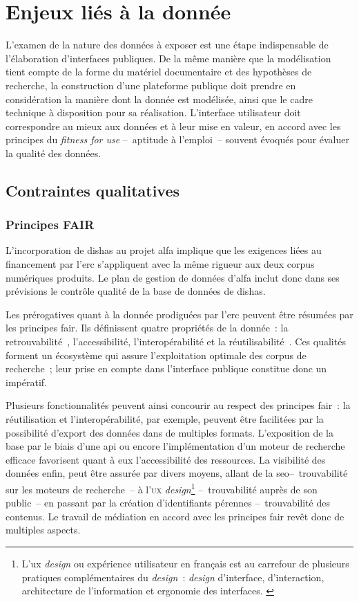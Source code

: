 \documentclass[a4paper,12pt,twoside]{book}
\newcommand{\eng}{\emph}
\newcommand{\bdd}{base de données\xspace}
\newcommand{\g}[1]{\og#1~\fg}
\newcommand{\dishas}{\gls{dishas}\xspace}
\newcommand{\alfa}{\gls{alfa}\xspace}
\newcommand{\erc}{\gls{erc}\xspace}
\newcommand{\fair}{\gls{fair}\xspace}
\newcommand{\api}{\gls{api}\xspace}
\newcommand{\seo}{\gls{seo}\xspace}
\newcommand{\ux}{\gls{ux} \emph{design}\xspace}
\begin{document}
	\section{Enjeux liés à la donnée}
L'examen de la nature des données à exposer est une étape indispensable de l'élaboration d'interfaces publiques. De la même manière que la modélisation tient compte de la forme du matériel documentaire et des hypothèses de recherche, la construction d'une plateforme publique doit prendre en considération la manière dont la donnée est modélisée, ainsi que le cadre technique à disposition pour sa réalisation. L'interface utilisateur doit correspondre au mieux aux données et à leur mise en valeur, en accord avec les principes du \eng{fitness for use} –~aptitude à l'emploi~– souvent évoqués pour évaluer la qualité des données.

		\subsection{Contraintes qualitatives}
			\subsubsection{Principes FAIR}
L'incorporation de \dishas au projet \alfa implique que les exigences liées au financement par l'\erc s'appliquent avec la même rigueur aux deux corpus numériques produits. Le plan de gestion de données d'\alfa inclut donc dans ses prévisions le contrôle qualité de la \bdd de \dishas.

Les prérogatives quant à la donnée prodiguées par l'\erc peuvent être résumées par les principes \fair. Ils définissent quatre propriétés de la donnée~: la \g{retrouvabilité}, l'accessibilité, l'interopérabilité et la \g{réutilisabilité}. Ces qualités forment un écosystème qui assure l'exploitation optimale des corpus de recherche~; leur prise en compte dans l'interface publique constitue donc un impératif.

Plusieurs fonctionnalités peuvent ainsi concourir au respect des principes \fair~: la réutilisation et l'interopérabilité, par exemple, peuvent être facilitées par la possibilité d'export des données dans de multiples formats. L'exposition de la base par le biais d'une \api ou encore l'implémentation d'un moteur de recherche efficace favorisent quant à eux l'accessibilité des ressources. La visibilité des données enfin, peut être assurée par divers moyens, allant de la \seo –~trouvabilité sur les moteurs de recherche~– à l'\textsc{ux} \eng{design}\footnote{L'\ux ou expérience utilisateur en français est au carrefour de plusieurs pratiques complémentaires du \eng{design}~: \eng{design} d'interface, d'interaction, architecture de l'information et ergonomie des interfaces. \cite{drouillatDesignInteractifWeb2016}} –~trouvabilité auprès de son public~– en passant par la création d'identifiants pérennes –~trouvabilité des contenus. Le travail de médiation en accord avec les principes \fair revêt donc de multiples aspects.
\end{document}
